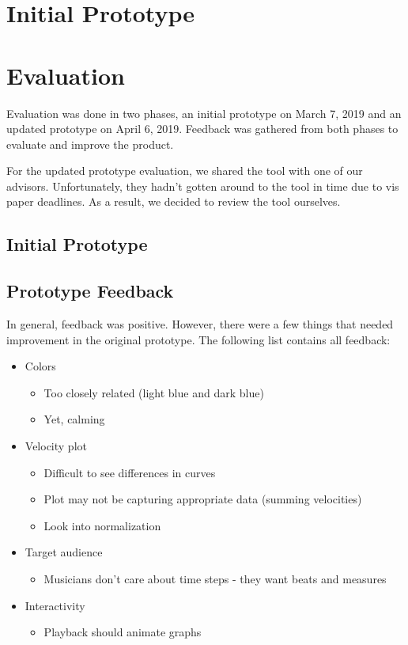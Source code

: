\documentclass[journal]{vgtc}                %
\begin{document}
\section{Initial Prototype}

\section{Evaluation}

Evaluation was done in two phases, an initial prototype on March 7, 2019 and an
updated prototype on April 6, 2019. Feedback was gathered from both phases to
evaluate and improve the product.

For the updated prototype evaluation, we shared the tool with one of our advisors.
Unfortunately, they hadn’t gotten around to the tool in time due to vis paper
deadlines. As a result, we decided to review the tool ourselves.

\subsection{Initial Prototype}

\subsection{Prototype Feedback}

In general, feedback was positive. However, there were a few things
that needed improvement in the original prototype. The following
list contains all feedback:

\begin{itemize}
  \item Colors
  \begin{itemize}
    \item Too closely related (light blue and dark blue)
    \item Yet, calming
  \end{itemize}
  \item Velocity plot
  \begin{itemize}
    \item Difficult to see differences in curves
    \item Plot may not be capturing appropriate data (summing velocities)
    \item Look into normalization
  \end{itemize}
  \item Target audience
  \begin{itemize}
    \item Musicians don't care about time steps - they want beats and measures
  \end{itemize}
  \item Interactivity
  \begin{itemize}
    \item Playback should animate graphs
  \end{itemize}
\end{itemize}
\end{document}
